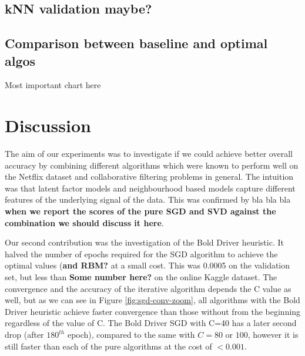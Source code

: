\documentclass[10pt,conference,compsocconf]{IEEEtran}
\begin{document}
\subsection{kNN validation maybe?}

\subsection{Comparison between baseline and optimal algos}
Most important chart here


\section{Discussion}
\label{sec:discussion}
The aim of our experiments was to investigate if we could achieve better overall accuracy by combining different algorithms which were known to perform well on the Netflix dataset and collaborative filtering problems in general. The intuition was that latent factor models and neighbourhood based models capture different features of the underlying signal of the data. This was confirmed by bla bla bla \textbf{when we report the scores  of the pure SGD and SVD against the combination we should discuss it here}. 

Our second contribution was the investigation of the Bold Driver heuristic. It halved the number of epochs required for the SGD algorithm to achieve the optimal values (\textbf{and RBM?} at a small cost. This was 0.0005 on the validation set, but less than \textbf{Some number here?} on the online Kaggle dataset. The convergence and the accuracy of the iterative algorithm depends the C value as well, but as we can see in Figure \ref{fig:sgd-conv-zoom}, all algorithms with the Bold Driver heuristic achieve faster convergence than those without from the beginning regardless of the value of C. The Bold Driver SGD with C=40 has a later second drop (after $180^{th}$ epoch), compared to the same with $C=80$ or $100$, however it is still faster than each of the pure algorithms at the cost of $<0.001$.




%
%
\end{document}
